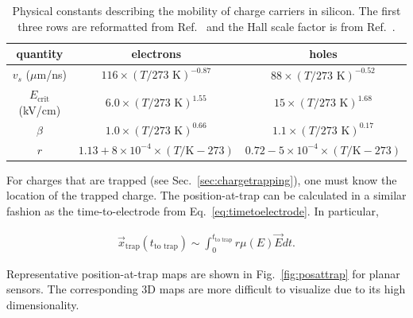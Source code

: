 \begin{table}[!htpb]
\centering
\begin{tabular}{|c|c|c|}
  \hline
   quantity & electrons & holes		\\
   \hline	
  $v_s$ ($\mu$m/ns) & $116\times (T/273\text{ K})^{-0.87}$ & $88\times (T/273\text{ K})^{-0.52}$ \\
  $E_\text{crit}$ (kV/cm) & $6.0 \times (T/273\text{ K})^{1.55}$ & $15 \times  (T/273\text{ K})^{1.68}$ \\
  $\beta$ & $1.0 \times (T/273\text{ K})^{0.66} $& $1.1\times (T/273\text{ K})^{0.17} $\\
  $r$ &$1.13+8\times 10^{-4}\times (T/\text{K}-273)$ & $0.72-5\times 10^{-4}\times (T/\text{K}-273)$\\
  \hline  
\end{tabular}
\caption{Physical constants describing the mobility of charge carriers in silicon.  The first three rows are reformatted from Ref.~\cite{JACOBONI197777} and the Hall scale factor is from Ref.~\cite{hall1}.}
\label{eq:constants_rad}
\end{table}

For charges that are trapped (see Sec.~\ref{sec:chargetrapping}), one must know the location of the trapped charge.  The position-at-trap can be calculated in a similar fashion as the time-to-electrode from Eq.~\ref{eq:timetoelectrode}.  In particular, 

\begin{align}
\label{eq:traptimetoelectrode}
\vec{x}_\text{trap}(t_\text{to trap})\sim\int_\text{$0$}^\text{$t_\text{to trap}$}r\mu(E)\vec{E}dt.
\end{align}

\noindent Representative position-at-trap maps are shown in Fig.~\ref{fig:posattrap} for planar sensors.  The corresponding 3D maps are more difficult to visualize due to its high dimensionality.

